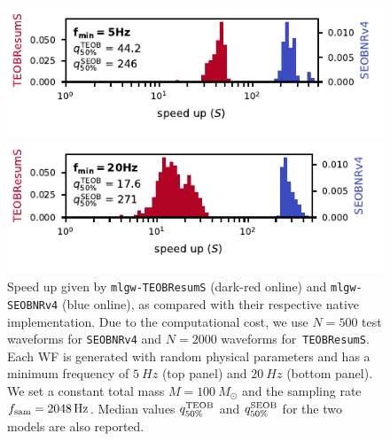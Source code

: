 \documentclass[twocolumn,showpacs,preprintnumbers,nofootinbib,prd,
superscriptaddress,10pt]{revtex4-1}
\begin{document}
\newcommand{\factor}{.9}
\begin{figure}
	\centering
	\begin{minipage}{\factor\linewidth}
	    \includegraphics[width=\linewidth]{img/compare_time_hist_5.pdf}
	\end{minipage}\hfill
	\begin{minipage}{\factor\linewidth}
	    \includegraphics[width=\linewidth]{img/compare_time_hist_20.pdf}
	\end{minipage}

	\caption{
Speed up given by \texttt{mlgw-TEOBResumS} (dark-red online) and \texttt{mlgw-SEOBNRv4} (blue online), 
as compared with their respective native implementation. 
Due to the computational cost, we use $N=500$ test waveforms for \texttt{SEOBNRv4} 
and $N=2000$ waveforms for~\texttt{TEOBResumS}. Each WF is generated with random physical 
parameters and has a minimum frequency of $\SI{5}{Hz}$ (top panel) and $\SI{20}{Hz}$ (bottom panel).
We set a constant total mass $M=\SI{100}{M_\odot}$ and the sampling rate $f_{\rm sam} = \SI{2048}{Hz}$.
Median values $q^{\rm TEOB}_{50\%}$ and $q^{\rm SEOB}_{50\%}$ for the two models are also reported.
}
	\label{fig:time_performance_hist}
\end{figure}
\end{document}
